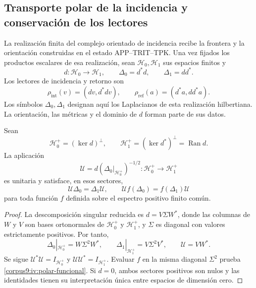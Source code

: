 \subsection{Transporte polar de la incidencia y conservación de los lectores}
\label{corpus9:iv:polar}

La realización finita del complejo orientado de incidencia
recibe la frontera y la orientación construidas en el estado
APP--TRIT--TPK. Una vez fijados los productos escalares de
esa realización, sean \(\mathcal H_0,\mathcal H_1\) sus
espacios finitos y
\[
 d:\mathcal H_0\longrightarrow\mathcal H_1,\qquad
 \Delta_0=d^*d,\qquad \Delta_1=dd^*.
\]
Los lectores de incidencia y retorno son
\[
 \rho_{\mathrm{int}}(v)=(dv,d^*dv),\qquad
 \rho_{\mathrm{ref}}(a)=(d^*a,dd^*a).
\]
Los símbolos \(\Delta_0,\Delta_1\) designan aquí los
Laplacianos de esta realización hilbertiana. La orientación,
las métricas y el dominio de \(d\) forman parte de sus datos.

\begin{proposition}
\label{corpus9:iv:polar-transporte}
Sean
\[
 \mathcal H_0^+=(\ker d)^\perp,\qquad
 \mathcal H_1^+=(\ker d^*)^\perp=\operatorname{Ran}d.
\]
La aplicación
\begin{equation}
 \mathcal U=d(\Delta_0|_{\mathcal H_0^+})^{-1/2}
    :\mathcal H_0^+\longrightarrow\mathcal H_1^+
 \label{corpus9:iv:polar-operador}
\end{equation}
es unitaria y satisface, en esos sectores,
\begin{equation}
 \mathcal U\Delta_0=\Delta_1\mathcal U,\qquad
 \mathcal U f(\Delta_0)=f(\Delta_1)\mathcal U
 \label{corpus9:iv:polar-funcional}
\end{equation}
para toda función \(f\) definida sobre el espectro positivo
finito común.
\end{proposition}
\begin{proof}
La descomposición singular reducida es \(d=V\Sigma W^*\),
donde las columnas de \(W\) y \(V\) son bases ortonormales
de \(\mathcal H_0^+\) y \(\mathcal H_1^+\), y \(\Sigma\)
es diagonal con valores estrictamente positivos. Por tanto,
\[
 \Delta_0|_{\mathcal H_0^+}=W\Sigma^2W^*,\qquad
 \Delta_1|_{\mathcal H_1^+}=V\Sigma^2V^*,\qquad
 \mathcal U=VW^*.
\]
Se sigue \(\mathcal U^*\mathcal U=I_{\mathcal H_0^+}\) y
\(\mathcal U\mathcal U^*=I_{\mathcal H_1^+}\). Evaluar \(f\)
en la misma diagonal \(\Sigma^2\) prueba
\eqref{corpus9:iv:polar-funcional}. Si \(d=0\), ambos
sectores positivos son nulos y las identidades tienen su
interpretación única entre espacios de dimensión cero.
\end{proof}

